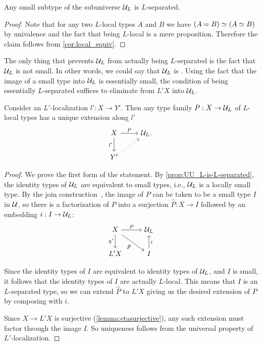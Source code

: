 \begin{prp}\label{prop:UU_L-is-L-separated}
Any small subtype of the subuniverse $\mathcal{U}_L$ is $L$-separated.
\end{prp}

\begin{proof}
    Note that for any two $L$-local types $A$ and $B$ we have $\eqv{(A=B)}{(\eqv{A}{B})}$ by univalence and the
    fact that being $L$-local is a mere proposition. Therefore the claim follows from \cref{cor:local_equiv}.
\end{proof}

The only thing that prevents $\mathcal{U}_L$ from actually being $L$-separated is the fact that $\mathcal{U}_L$ is not small. In other words, we could say that $\mathcal{U}_L$ is . Using the fact that the image of a small type into $\mathcal{U}_L$ is essentially small, the condition of being essentially $L$-separated suffices to eliminate from $L'X$ into $\mathcal{U}_L$.

\begin{lem}\label{lemma:extendtoUL}
Consider an $L'$-localization $l':X\to Y'$. Then any type family $P:X\to\mathcal{U}_L$ of $L$-local types has a unique extension along $l'$
\begin{equation*}
\begin{tikzcd}
X \arrow[d,swap,"{l'}"] \arrow[r,"P"] & \UU_L. \\
Y' \arrow[ur,densely dotted]
\end{tikzcd}
\end{equation*}
\end{lem}

\begin{proof}
    We prove the first form of the statement.
    By \cref{prop:UU_L-is-L-separated}, the identity types of $\mathcal{U}_L$ are
    equivalent to small types, i.e., $\mathcal{U}_L$ is a locally small type.
    By the join construction~\cite{joinconstruction}, the image of $P$
    can be taken to be a small type $I$ in $\mathcal{U}$, so there is a factorization
    of $P$ into a surjection $\hat{P} : X \to I$ followed by
    an embedding $i : I \to \mathcal{U}_L$:
\begin{equation*}
\begin{tikzcd}
X \arrow[d,swap,"\modalunit'"] \arrow[r,"P"] \arrow[dr,swap,"\hat{P}"] & \UU_L \\
L'X & I \arrow[u,swap,"i"] 
\end{tikzcd}
\end{equation*}

    Since the identity types of $I$ are equivalent to identity types
    of $\mathcal{U}_L$, and $I$ is small, it follows that the identity types of $I$ are actually $L$-local.
    This means that $I$ is an $L$-separated type, so we can extend $\hat{P}$ to $L' X$ 
    giving us the desired extension of $P$ by composing with $i$.

    Since $X \to L'X$ is surjective (\cref{lemma:etasurjective}),
    any such extension must factor through the image $I$.
    So uniqueness follows from the universal property of $L'$-localization.
\end{proof}

